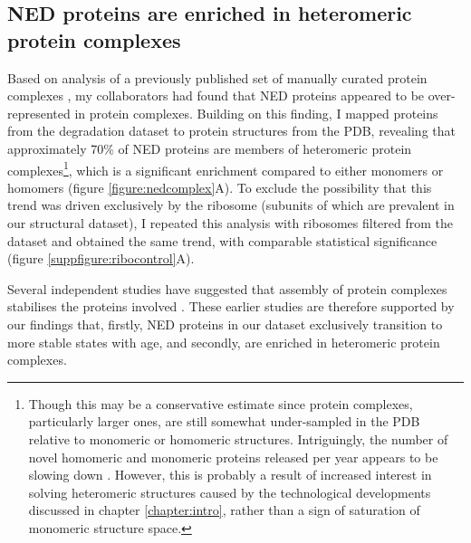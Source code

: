 \documentclass[a4paper,11pt,twoside,openright]{scrbook}
\begin{document}
\subsection{NED proteins are enriched in heteromeric protein complexes}
Based on analysis of a previously published set of manually curated protein complexes \cite{Ori2016}, my collaborators had found that NED proteins appeared to be over-represented in protein complexes. Building on this finding, I mapped proteins from the degradation dataset to protein structures from the PDB, revealing that approximately 70\% of NED proteins are members of heteromeric protein complexes\footnote{Though this may be a conservative estimate since protein complexes, particularly larger ones, are still somewhat under-sampled in the PDB relative to monomeric or homomeric structures. Intriguingly, the number of novel homomeric and monomeric proteins released per year appears to be slowing down \cite{Perica2012a,Marsh2015}. However, this is probably a result of increased interest in solving heteromeric structures caused by the technological developments discussed in chapter \ref{chapter:intro}, rather than a sign of saturation of monomeric structure space.}, which is a significant enrichment compared to either monomers or homomers (figure \ref{figure:nedcomplex}A). To exclude the possibility that this trend was driven exclusively by the ribosome (subunits of which are prevalent in our structural dataset), I repeated this analysis with ribosomes filtered from the dataset and obtained the same trend, with comparable statistical significance (figure \ref{suppfigure:ribocontrol}A).

Several independent studies have suggested that assembly of protein complexes stabilises the proteins involved \cite{Goldberg2003,Malinverni2006,Toyama2013}. These earlier studies are therefore supported by our findings that, firstly, NED proteins in our dataset exclusively transition to more stable states with age, and secondly, are enriched in heteromeric protein complexes.

\end{document}
